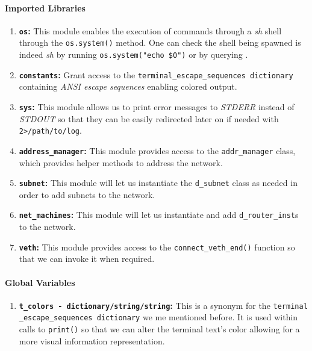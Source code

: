     \paragraph{Imported Libraries}
        \begin{enumerate}
            \item \textbf{\texttt{os}:} This module enables the execution of commands through a \textit{sh} shell through the \texttt{os.system()} method. One can check the shell being spawned is indeed \textit{sh} by running \texttt{\allowbreak os.system("echo \$0")} or by querying \cite{bib:man-system}.
            \item \textbf{\texttt{constants}:} Grant access to the \texttt{\allowbreak terminal\_escape\_sequences dictionary} containing \textit{ANSI escape sequences} enabling colored output.
            \item \textbf{\texttt{sys}:} This module allows us to print error messages to \textit{STDERR} instead of \textit{STDOUT} so that they can be easily redirected later on if needed with \texttt{2>/path/to/log}.
            \item \textbf{\texttt{address\_manager}:} This module provides access to the \texttt{addr\_manager} class, which provides helper methods to address the network.
            \item \textbf{\texttt{subnet}:} This module will let us instantiate the \texttt{d\_subnet} class as needed in order to add subnets to the network.
            \item \textbf{\texttt{net\_machines}:} This module will let us instantiate and add \texttt{d\_router\_inst}s to the network.
            \item \textbf{\texttt{veth}:} This module provides access to the \texttt{connect\_veth\_end()} function so that we can invoke it when required.
        \end{enumerate}

    \paragraph{Global Variables}
        \begin{enumerate}
            \item \textbf{\texttt{\allowbreak t\_colors - dictionary/string/string}:} This is a synonym for the \texttt{\allowbreak terminal \_escape\_sequences dictionary} we me mentioned before. It is used within calls to \texttt{print()} so that we can alter the terminal text's color allowing for a more visual information representation.
        \end{enumerate}

